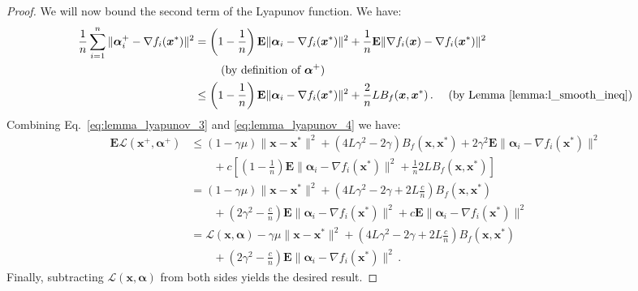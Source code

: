 \documentclass{article}
\newcommand{\Econd}{\mathbf{E}}
\def\xx{{\boldsymbol x}}
\def\balpha{{\boldsymbol \alpha}}
\begin{document}
\begin{proof}
\hfill

We will now bound the second term of the Lyapunov function. We have:
  \begin{align}\label{eq:lemma_lyapunov_4}
    \frac{1}{n}\sum_{i=1}^n \|{\boldsymbol\alpha}_i^+ - \nabla f_i(\xx^*)\|^2 &= \left( 1 - \frac{1}{n}\right) \Econd \|{\boldsymbol\alpha}_i - \nabla f_i(\xx^*)\|^2 + \frac{1}{n}\Econd\|\nabla f_i(\xx) - \nabla f_i(\xx^*)\|^2  \nonumber\\
    &\qquad \text{ (by definition of $\balpha^+$)}\\
    &\leq \left( 1 - \frac{1}{n}\right) \Econd \|{\boldsymbol\alpha}_i - \nabla f_i(\xx^*)\|^2 + \frac{2}{n}L B_f(\xx, \xx^*)\,.\quad \text{ (by Lemma~\ref{lemma:l_smooth_ineq})}
  \end{align}
Combining Eq.~\eqref{eq:lemma_lyapunov_3} and \eqref{eq:lemma_lyapunov_4} we have:
\begin{align}
\Econd \mathcal{L}(\xx^+, {\boldsymbol\alpha}^+) &\leq (1 - \gamma \mu)\|\xx - \xx^*\|^2 +  (4 L \gamma^2 - 2 \gamma) B_f(\xx, \xx^*) + 2 \gamma^2 \Econd \|{\boldsymbol\alpha}_i - \nabla f_i(\xx^*)\|^2 \nonumber\\
 &\qquad + c\left[\left( 1 - \frac{1}{n}\right) \Econd \|{\boldsymbol\alpha}_i - \nabla f_i(\xx^*)\|^2 + \frac{1}{n}2 L B_f(\xx, \xx^*)\right] \nonumber\\
 &=  (1 - \gamma \mu)\|\xx - \xx^*\|^2 +  \left(4 L \gamma^2 - 2 \gamma + 2L\frac{c}{n}\right) B_f(\xx, \xx^*) \nonumber\\
  & \qquad + \left(2 \gamma^2 - \frac{c}{n}\right) \Econd \|{\boldsymbol\alpha}_i - \nabla f_i(\xx^*)\|^2 + c \Econd \|{\boldsymbol\alpha}_i - \nabla f_i(\xx^*)\|^2 \nonumber\\
  &= \mathcal{L}(\xx,{\boldsymbol\alpha})  - \gamma \mu \|\xx - \xx^*\|^2 + \left(4 L \gamma^2 - 2 \gamma + 2L\frac{c}{n}\right) B_f(\xx, \xx^*) \nonumber \\
  & \qquad+ \left(2 \gamma^2 - \frac{c}{n}\right) \Econd \|{\boldsymbol\alpha}_i - \nabla f_i(\xx^*)\|^2\,.
\end{align}
Finally, subtracting $\mathcal{L}(\xx,{\boldsymbol\alpha})$ from both sides yields the desired result.
\end{proof}
\end{document}
